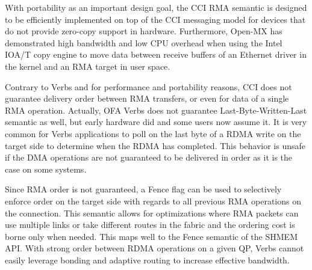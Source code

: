 With portability as an important design goal, the CCI RMA semantic is 
designed to be efficiently implemented on top of the CCI messaging model 
for devices that do not provide zero-copy support in hardware. 
Furthermore, Open-MX\cite{Gog11ParCo} has demonstrated high bandwidth and low CPU 
overhead when using the Intel IOA/T copy engine to move data between receive 
buffers of an Ethernet driver in the kernel and an RMA target in user 
space.

Contrary to Verbs  and for performance and portability reasons, CCI does not guarantee delivery 
order between RMA transfers, or even for data of a single RMA operation. 
Actually, OFA Verbs does not guarantee Last-Byte-Written-Last 
semantic as well, but early hardware did and some users now assume it. It is 
very common for Verbs applications to poll on the last byte of a RDMA write 
on the target side to determine when the RDMA has completed. This behavior is 
unsafe if the DMA operations are not guaranteed to be delivered in order as 
it is the case on some systems.

Since RMA order is not guaranteed, a Fence flag can be used to selectively 
enforce order on the target side with regards to all previous RMA operations 
on the connection. This semantic allows for optimizations where RMA packets 
can use multiple links or take different routes in the fabric and the ordering 
cost is borne only when needed. This maps well to the Fence semantic of the 
SHMEM~\cite{openshmem} API. With strong order between RDMA operations on a 
given QP, Verbs cannot easily leverage  bonding and adaptive routing to 
increase effective bandwidth.
